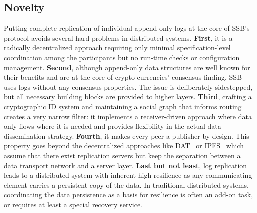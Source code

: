 \documentclass[9pt,sigconf]{acmart}
\begin{document}
\subsection*{Novelty}

Putting complete replication of individual append-only logs at the
core of SSB's protocol avoids several hard problems in distributed
systems. {\bf First}, it is a radically decentralized approach
requiring only minimal specification-level coordination among the
participants but no run-time checks or configuration
management.
{\bf Second}, although append-only
data structures are well known for their benefits and are at the core
of crypto currencies' consensus finding, SSB uses logs without any
consensus properties. The issue is deliberately sidestepped, but all
necessary building blocks are provided to higher layers.
{\bf Third}, crafting a cryptographic ID system and
maintaining a social graph that informs routing creates a very narrow
filter: it implements a receiver-driven approach where
data only flows where it is needed and provides flexibility in the actual data dissemination strategy.
{\bf Fourth}, it makes every peer a
publisher by design. This property goes beyond the decentralized
approaches like DAT~\cite{datproject} or IPFS~\cite{benet2014ipfs} which assume that there
exist replication servers but keep the separation between a data
transport network and a server layer.
{\bf Last but not least}, log replication leads to a
distributed system with inherent high resilience as any communicating
element carries a persistent copy of the data. In traditional distributed
systems, coordinating the data persistence as a basis for resilience
is often an add-on task, or requires at least a special recovery
service.
\end{document}
